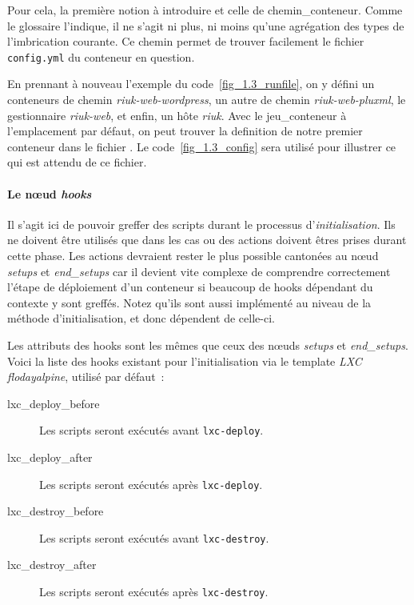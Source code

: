 Pour cela, la première notion à introduire et celle de \gls{chemin_conteneur}.
Comme le glossaire l'indique, il ne s'agit ni plus, ni moins qu'une agrégation des types de l'\gls{imbrication} courante.
Ce chemin permet de trouver facilement le fichier {\tt config.yml} du conteneur en question.

En prennant à nouveau l'exemple du code~\ref{fig_1.3_runfile}, on y défini un conteneurs de chemin \emph{riuk-web-wordpress}, un autre de chemin \emph{riuk-web-pluxml}, le gestionnaire \emph{riuk-web}, et enfin, un hôte \emph{riuk}.
Avec le \gls{jeu_conteneur} à l'emplacement par défaut, on peut trouver la \gls{definition} de notre premier conteneur dans le fichier .
Le code~\ref{fig_1.3_config} sera utilisé pour illustrer ce qui est attendu de ce fichier.



\paragraph{Le nœud \emph{hooks}}
Il s'agit ici de pouvoir greffer des scripts durant le processus d'\emph{initialisation}.
Ils ne doivent être utilisés que dans les cas ou des actions doivent êtres prises durant cette phase.
Les actions devraient rester le plus possible cantonées au nœud \emph{setups} et \emph{end\_setups} car il devient vite complexe de comprendre correctement l'étape de déploiement d'un conteneur si beaucoup de hooks dépendant du contexte y sont greffés.
Notez qu'ils sont aussi implémenté au niveau de la méthode d'\gls{initialisation}, et donc dépendent de celle-ci.

Les attributs des hooks sont les mêmes que ceux des nœuds \emph{setups} et \emph{end\_setups}.
Voici la liste des hooks existant pour l'initialisation via le template \emph{LXC} \emph{flodayalpine}, utilisé par défaut~:

\begin{description}
	\item[lxc\_deploy\_before] Les scripts seront exécutés avant {\tt lxc-deploy}.
	\item[lxc\_deploy\_after] Les scripts seront exécutés après {\tt lxc-deploy}.
	\item[lxc\_destroy\_before] Les scripts seront exécutés avant {\tt lxc-destroy}.
	\item[lxc\_destroy\_after] Les scripts seront exécutés après {\tt lxc-destroy}.
\end{description}

